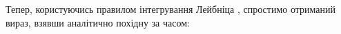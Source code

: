 Тепер, користуючись правилом інтегрування Лейбніца \cite{imp:NumRecipes2007}, 
спростимо отриманий вираз, взявши аналітично похідну за часом:
%
%
%
%
